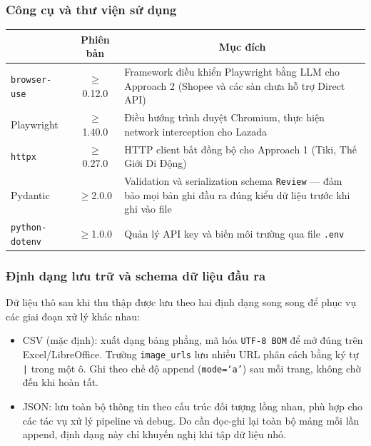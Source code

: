 \subsubsection{Công cụ và thư viện sử dụng}

\begin{center}
\renewcommand{\arraystretch}{1.4}
\begin{tabularx}{\textwidth}{|l|c|X|}
\hline
\rowcolor[HTML]{E8E8E8}
\multicolumn{1}{|c|}{\textbf{Công cụ}} &
\multicolumn{1}{c|}{\textbf{Phiên bản}} &
\multicolumn{1}{c|}{\textbf{Mục đích}} \\
\hline
\texttt{browser-use} & $\geq$0.12.0 & Framework điều khiển Playwright bằng LLM cho Approach 2 (Shopee và các sàn chưa hỗ trợ Direct API) \\
\hline
Playwright & $\geq$1.40.0 & Điều hướng trình duyệt Chromium, thực hiện network interception cho Lazada \\
\hline
\texttt{httpx} & $\geq$0.27.0 & HTTP client bất đồng bộ cho Approach 1 (Tiki, Thế Giới Di Động) \\
\hline
Pydantic & $\geq$2.0.0 & Validation và serialization schema \texttt{Review} --- đảm bảo mọi bản ghi đầu ra đúng kiểu dữ liệu trước khi ghi vào file \\
\hline
\texttt{python-dotenv} & $\geq$1.0.0 & Quản lý API key và biến môi trường qua file \texttt{.env} \\
\hline
\end{tabularx}
\end{center}

\subsubsection{Định dạng lưu trữ và schema dữ liệu đầu ra}

Dữ liệu thô sau khi thu thập được lưu theo hai định dạng song song để phục vụ các giai đoạn xử lý khác nhau:

\begin{itemize}[labelsep=10pt, leftmargin=2cm]
    \item CSV (mặc định): xuất dạng bảng phẳng, mã hóa \texttt{UTF-8 BOM} để mở đúng trên Excel/LibreOffice. Trường \texttt{image\_urls} lưu nhiều URL phân cách bằng ký tự \texttt{|} trong một ô. Ghi theo chế độ append (\texttt{mode=`a'}) sau mỗi trang, không chờ đến khi hoàn tất.
    \item JSON: lưu toàn bộ thông tin theo cấu trúc đối tượng lồng nhau, phù hợp cho các tác vụ xử lý pipeline và debug. Do cần đọc-ghi lại toàn bộ mảng mỗi lần append, định dạng này chỉ khuyến nghị khi tập dữ liệu nhỏ.
\end{itemize}

